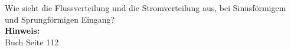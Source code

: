 \begin{question}[section=4,subsection=42,name={Diffusion magnetischer Felder},difficulty=7,type=mdl,tags={}]
	Wie sieht die Flussverteilung und die Stromverteilung aus, bei Sinusförmigem und Sprungförmigen Eingang?
	\\ \textbf{Hinweis:}\\
	Buch Seite 112
\end{question}
\begin{solution}
	
\end{solution}